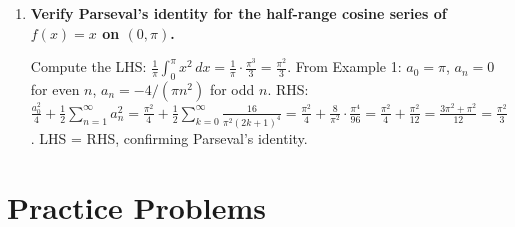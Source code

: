 \documentclass[12pt,a4paper]{article}
\begin{document}
\begin{enumerate}[leftmargin=*, label=\textbf{Q\arabic*.}]
The boundary conditions $u(0,t)=u(\pi,t)=0$ require the spatial eigenfunctions to vanish at both ends, which means $\sin(nx)$ for $n=1,2,3,\ldots$ The half-range sine series of $f(x)=x(\pi-x)$ on $(0,\pi)$ (derived in Example 2) gives $b_n = \frac{8}{\pi n^3}$ for odd $n$, $b_n=0$ for even $n$. The general solution is $u(x,t) = \sum_{n=1,3,5,\ldots} b_n\cos(nct)\sin(nx)$, where the $\cos(nct)$ factor arises from the zero initial velocity condition.

\item \textbf{Verify Parseval's identity for the half-range cosine series of $f(x)=x$ on $(0,\pi)$.}

Compute the LHS: $\frac{1}{\pi}\int_0^{\pi}x^2\,dx = \frac{1}{\pi}\cdot\frac{\pi^3}{3} = \frac{\pi^2}{3}$.
From Example 1: $a_0 = \pi$, $a_n = 0$ for even $n$, $a_n = -4/(\pi n^2)$ for odd $n$.
RHS: $\frac{a_0^2}{4} + \frac{1}{2}\sum_{n=1}^{\infty}a_n^2 = \frac{\pi^2}{4} + \frac{1}{2}\sum_{k=0}^{\infty}\frac{16}{\pi^2(2k+1)^4} = \frac{\pi^2}{4} + \frac{8}{\pi^2}\cdot\frac{\pi^4}{96} = \frac{\pi^2}{4} + \frac{\pi^2}{12} = \frac{3\pi^2+\pi^2}{12} = \frac{\pi^2}{3}$. LHS = RHS, confirming Parseval's identity.

\end{enumerate}

\section{Practice Problems}
\end{document}
